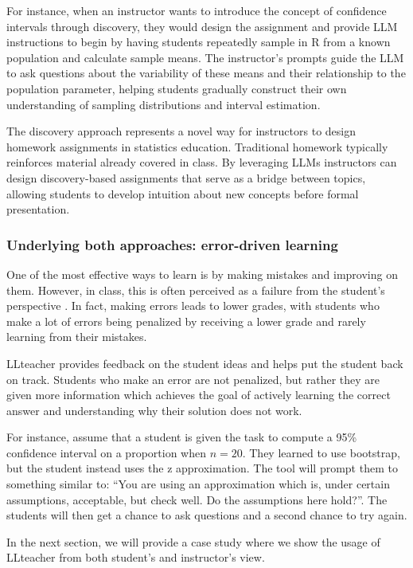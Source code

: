 \documentclass[
  12pt]{article}
\begin{document}
For instance, when an instructor wants to introduce the concept of confidence intervals through discovery, they would design the assignment and provide LLM instructions to begin by having students repeatedly sample in R from a known population and calculate sample means.
The instructor's prompts guide the LLM to ask questions about the variability of these means and their relationship to the population parameter, helping students gradually construct their own understanding of sampling distributions and interval estimation.

The discovery approach represents a novel way for instructors to design homework assignments in statistics education.
Traditional homework typically reinforces material already covered in class. By leveraging LLMs instructors can design discovery-based assignments that serve as a bridge between topics, allowing students to develop intuition about new concepts before formal presentation.



\subsubsection{Underlying both approaches: error-driven learning}

One of the most effective ways to learn is by making mistakes and improving on them. However, in class, this is often perceived as a failure from the student's perspective \citep{tulis-et-al-2016}. In fact, making errors leads to lower grades, with students who make a lot of errors being penalized by receiving a lower grade and rarely learning from their mistakes.

LLteacher provides feedback on the student ideas and helps put the student back on track. Students who make an error are not penalized, but rather they are given more information which achieves the goal of actively learning the correct answer and understanding why their solution does not work.

For instance, assume that a student is given the task to compute a 95\% confidence interval on a proportion when $n=20$. They learned to use bootstrap, but the student instead uses the z approximation. The tool will prompt them to something similar to: ``You are using an approximation which is, under certain assumptions, acceptable, but check well. Do the assumptions here hold?''. The students will then get a chance to ask questions and a second chance to try again. 


In the next section, we will provide a case study where we show the usage of LLteacher from both student's and instructor's view.
\end{document}
